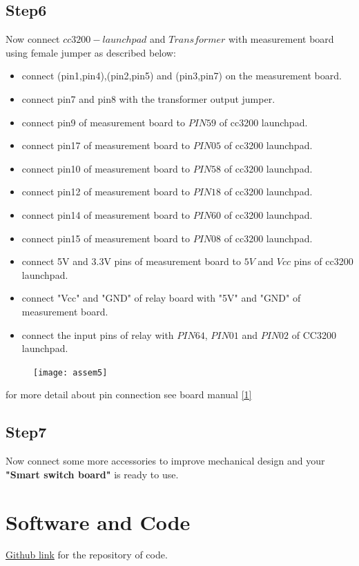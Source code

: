\documentclass[a4paper,12pt,oneside]{book}
\begin{document}
\subsection*{Step6}
Now connect $cc3200-launchpad$ and $Transformer$ with measurement board using female jumper as described below:
\begin{itemize}
	\item connect (pin1,pin4),(pin2,pin5) and (pin3,pin7) on the measurement board.
	\item connect pin7 and pin8 with the transformer output jumper.
	\item connect pin9 of measurement board to \textbf{$PIN59$} of cc3200 launchpad.
	\item connect pin17 of measurement board to \textbf{$PIN05$} of cc3200 launchpad.
	\item connect pin10 of measurement board to \textbf{$PIN58$} of cc3200 launchpad.
	\item connect pin12 of measurement board to \textbf{$PIN18$} of cc3200 launchpad.
	\item connect pin14 of measurement board to \textbf{$PIN60$} of cc3200 launchpad.
	\item connect pin15 of measurement board to \textbf{$PIN08$} of cc3200 launchpad.
	\item connect 5V and 3.3V pins of measurement board to $5V$ and $Vcc$ pins of cc3200 launchpad. 
	\item connect "Vcc" and "GND" of relay board with "5V" and "GND" of measurement board.
	\item connect the input pins of relay with $PIN64$, $PIN01$ and $PIN02$
	of CC3200 launchpad.
\end{itemize}
\newpage
\begin{figure}[h]
	\texttt{[image: assem5]}
\end{figure}
for more detail about pin connection see board manual \autoref{1}
\subsection*{Step7}
Now connect some more accessories to improve mechanical design and your \textbf{"Smart switch board"} is ready to use.

\newpage

\section{Software and Code}
\hspace{7mm}\href{https://github.com/eYSIP-2016/eYSIP2016-GHPowerMonitoring}{Github link} for the repository of code.\\
\end{document}
